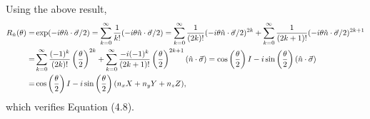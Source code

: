 \documentclass[en]{sol-man}
\begin{document}
\begin{pf}
    Using the above result,
    \begin{align}
        \notag R_{\hat{n}}(\theta)=&\exp(-i\theta\hat{n}\cdot\vec{\sigma}/2)=\sum_{k=0}^{\infty}\frac{1}{k!}(-i\theta\hat{n}\cdot\vec{\sigma}/2)=\sum_{k=0}^{\infty}\frac{1}{(2k)!}(-i\theta\hat{n}\cdot\vec{\sigma}/2)^{2k}+\sum_{k=0}^{\infty}\frac{1}{(2k+1)!}(-i\theta\hat{n}\cdot\vec{\sigma}/2)^{2k+1}\\
        \notag=&\sum_{k=0}^{\infty}\frac{(-1)^k}{(2k)!}\left(\frac{\theta}{2}\right)^{2k}+\sum_{k=0}^{\infty}\frac{-i(-1)^k}{(2k+1)!}\left(\frac{\theta}{2}\right)^{2k+1}(\hat{n}\cdot\vec{\sigma})=\cos\left(\frac{\theta}{2}\right)I-i\sin\left(\frac{\theta}{2}\right)(\hat{n}\cdot\vec{\sigma})\\
        =&\cos\left(\frac{\theta}{2}\right)I-i\sin\left(\frac{\theta}{2}\right)(n_xX+n_yY+n_zZ),
    \end{align}
    which verifies Equation (4.8).
\end{pf}

\ifx\allfiles\undefined
\end{document}
